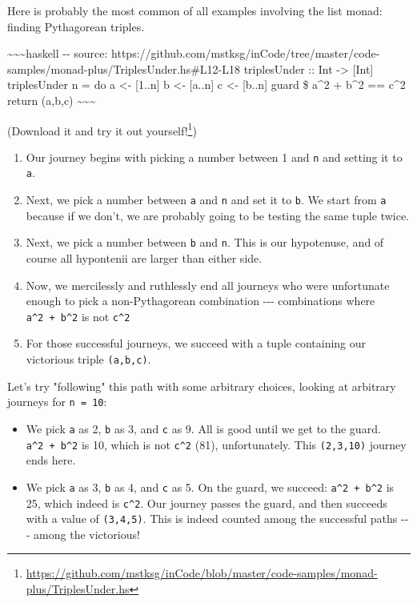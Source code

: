 \documentclass[]{article}
\renewcommand{\href}[2]{#2\footnote{\url{#1}}}
\begin{document}
Here is probably the most common of all examples involving the list monad:
finding Pythagorean triples.

\textasciitilde{}\textasciitilde{}\textasciitilde{}haskell -\/- source:
https://github.com/mstksg/inCode/tree/master/code-samples/monad-plus/TriplesUnder.hs\#L12-L18
triplesUnder :: Int -\textgreater{} {[}Int{]} triplesUnder n = do a \textless{}-
{[}1..n{]} b \textless{}- {[}a..n{]} c \textless{}- {[}b..n{]} guard \$ a\^{}2 +
b\^{}2 == c\^{}2 return (a,b,c)
\textasciitilde{}\textasciitilde{}\textasciitilde{}

(\href{https://github.com/mstksg/inCode/blob/master/code-samples/monad-plus/TriplesUnder.hs}{Download
it and try it out yourself!})

\begin{enumerate}
\tightlist
\item
  Our journey begins with picking a number between 1 and \texttt{n} and setting
  it to \texttt{a}.
\item
  Next, we pick a number between \texttt{a} and \texttt{n} and set it to
  \texttt{b}. We start from \texttt{a} because if we don't, we are probably
  going to be testing the same tuple twice.
\item
  Next, we pick a number between \texttt{b} and \texttt{n}. This is our
  hypotenuse, and of course all hypontenii are larger than either side.
\item
  Now, we mercilessly and ruthlessly end all journeys who were unfortunate
  enough to pick a non-Pythagorean combination -\/-\/- combinations where
  \texttt{a\^{}2\ +\ b\^{}2} is not \texttt{c\^{}2}
\item
  For those successful journeys, we succeed with a tuple containing our
  victorious triple \texttt{(a,b,c)}.
\end{enumerate}

Let's try "following" this path with some arbitrary choices, looking at
arbitrary journeys for \texttt{n\ =\ 10}:

\begin{itemize}
\tightlist
\item
  We pick \texttt{a} as 2, \texttt{b} as 3, and \texttt{c} as 9. All is good
  until we get to the guard. \texttt{a\^{}2\ +\ b\^{}2} is 10, which is not
  \texttt{c\^{}2} (81), unfortunately. This \texttt{(2,3,10)} journey ends here.
\item
  We pick \texttt{a} as 3, \texttt{b} as 4, and \texttt{c} as 5. On the guard,
  we succeed: \texttt{a\^{}2\ +\ b\^{}2} is 25, which indeed is \texttt{c\^{}2}.
  Our journey passes the guard, and then succeeds with a value of
  \texttt{(3,4,5)}. This is indeed counted among the successful paths -\/-\/-
  among the victorious!
\end{itemize}
\end{document}
